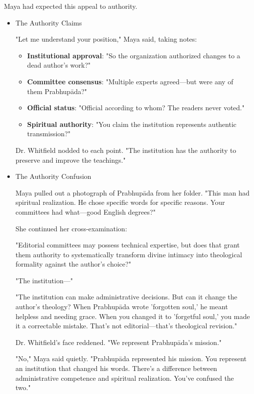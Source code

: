 \documentclass[11pt,twoside]{book}
\begin{document}
Maya had expected this appeal to authority.
\begin{itemize}
\item The Authority Claims
\label{sec:org8cd3021}

"Let me understand your position," Maya said, taking notes:

\begin{itemize}
\item \textbf{\textbf{Institutional approval}}: "So the organization authorized changes to a dead author's work?"
\item \textbf{\textbf{Committee consensus}}: "Multiple experts agreed—but were any of them Prabhupāda?"
\item \textbf{\textbf{Official status}}: "Official according to whom? The readers never voted."
\item \textbf{\textbf{Spiritual authority}}: "You claim the institution represents authentic transmission?"
\end{itemize}

Dr. Whitfield nodded to each point. "The institution has the authority to preserve and improve the teachings."
\item The Authority Confusion
\label{sec:org5455e40}

Maya pulled out a photograph of Prabhupāda from her folder. "This man had spiritual realization. He chose specific words for specific reasons. Your committees had what—good English degrees?"

She continued her cross-examination:

"Editorial committees may possess technical expertise, but does that grant them authority to systematically transform divine intimacy into theological formality against the author's choice?"

"The institution—"

"The institution can make administrative decisions. But can it change the author's theology? When Prabhupāda wrote 'forgotten soul,' he meant helpless and needing grace. When you changed it to 'forgetful soul,' you made it a correctable mistake. That's not editorial—that's theological revision."

Dr. Whitfield's face reddened. "We represent Prabhupāda's mission."

"No," Maya said quietly. "Prabhupāda represented his mission. You represent an institution that changed his words. There's a difference between administrative competence and spiritual realization. You've confused the two."
\end{itemize}
\end{document}

